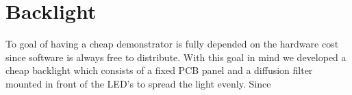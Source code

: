 \newpage
\section{Backlight}
To goal of having a cheap demonstrator is fully depended on the hardware cost since software is always free to distribute. With this goal in mind we developed a cheap backlight which consists of a fixed PCB panel and a diffusion filter mounted in front of the LED's to spread the light evenly. Since 
